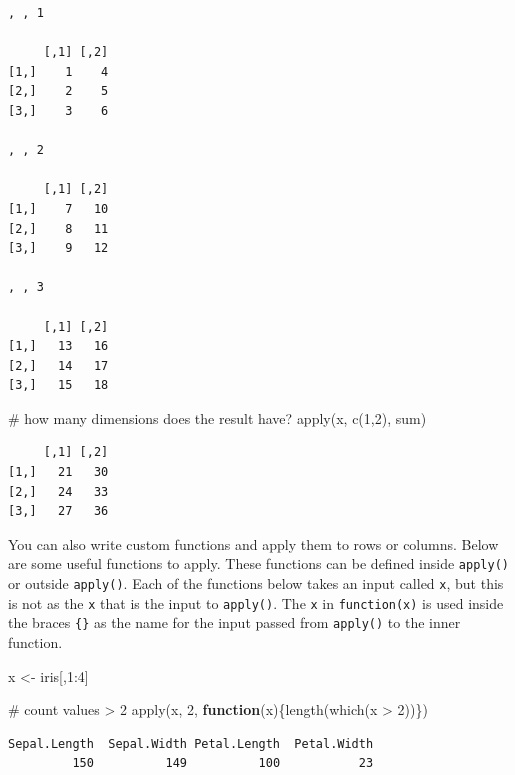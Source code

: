 \documentclass[
  13,
  letterpaper,
]{report}
\newenvironment{Shaded}{\begin{snugshade}}{\end{snugshade}}
\newcommand{\CommentTok}[1]{\textcolor[rgb]{0.37,0.37,0.37}{#1}}
\newcommand{\ControlFlowTok}[1]{\textcolor[rgb]{0.00,0.23,0.31}{\textbf{#1}}}
\newcommand{\DecValTok}[1]{\textcolor[rgb]{0.68,0.00,0.00}{#1}}
\newcommand{\FunctionTok}[1]{\textcolor[rgb]{0.28,0.35,0.67}{#1}}
\newcommand{\NormalTok}[1]{\textcolor[rgb]{0.00,0.23,0.31}{#1}}
\newcommand{\OtherTok}[1]{\textcolor[rgb]{0.00,0.23,0.31}{#1}}
\newcommand{\SpecialCharTok}[1]{\textcolor[rgb]{0.37,0.37,0.37}{#1}}
\begin{document}
\begin{verbatim}
, , 1

     [,1] [,2]
[1,]    1    4
[2,]    2    5
[3,]    3    6

, , 2

     [,1] [,2]
[1,]    7   10
[2,]    8   11
[3,]    9   12

, , 3

     [,1] [,2]
[1,]   13   16
[2,]   14   17
[3,]   15   18
\end{verbatim}

\begin{Shaded}
\begin{Highlighting}[]
\CommentTok{\# how many dimensions does the result have?}
\FunctionTok{apply}\NormalTok{(x, }\FunctionTok{c}\NormalTok{(}\DecValTok{1}\NormalTok{,}\DecValTok{2}\NormalTok{), sum)}
\end{Highlighting}
\end{Shaded}

\begin{verbatim}
     [,1] [,2]
[1,]   21   30
[2,]   24   33
[3,]   27   36
\end{verbatim}

You can also write custom functions and apply them to rows or columns.
Below are some useful functions to apply. These functions can be defined
inside \texttt{apply()} or outside \texttt{apply()}. Each of the
functions below takes an input called \texttt{x}, but this is not as the
\texttt{x} that is the input to \texttt{apply()}. The \texttt{x} in
\texttt{function(x)} is used inside the braces \texttt{\{\}} as the name
for the input passed from \texttt{apply()} to the inner function.

\begin{Shaded}
\begin{Highlighting}[]
\NormalTok{x }\OtherTok{\textless{}{-}}\NormalTok{ iris[,}\DecValTok{1}\SpecialCharTok{:}\DecValTok{4}\NormalTok{]}

\CommentTok{\# count values \textgreater{} 2}
\FunctionTok{apply}\NormalTok{(x, }\DecValTok{2}\NormalTok{, }\ControlFlowTok{function}\NormalTok{(x)\{}\FunctionTok{length}\NormalTok{(}\FunctionTok{which}\NormalTok{(x }\SpecialCharTok{\textgreater{}} \DecValTok{2}\NormalTok{))\})}
\end{Highlighting}
\end{Shaded}

\begin{verbatim}
Sepal.Length  Sepal.Width Petal.Length  Petal.Width 
         150          149          100           23 
\end{verbatim}
\end{document}
